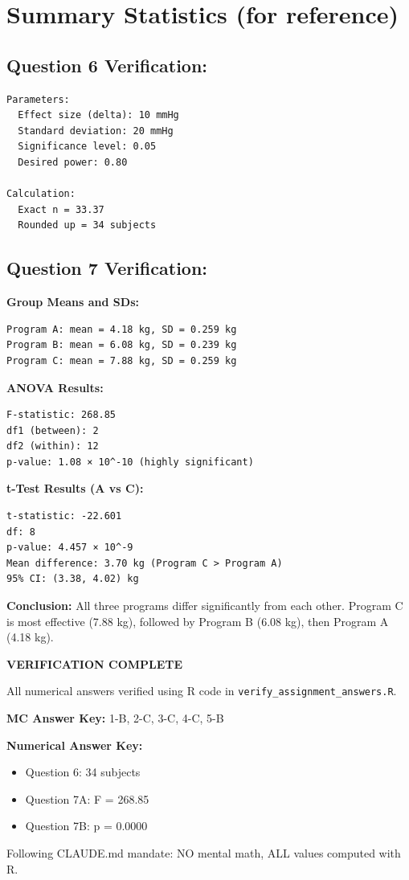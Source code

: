 \documentclass[11pt]{article}
\begin{document}
\newpage

\section*{Summary Statistics (for reference)}

\subsection*{Question 6 Verification:}
\begin{verbatim}
Parameters:
  Effect size (delta): 10 mmHg
  Standard deviation: 20 mmHg
  Significance level: 0.05
  Desired power: 0.80

Calculation:
  Exact n = 33.37
  Rounded up = 34 subjects
\end{verbatim}

\subsection*{Question 7 Verification:}
\textbf{Group Means and SDs:}
\begin{verbatim}
Program A: mean = 4.18 kg, SD = 0.259 kg
Program B: mean = 6.08 kg, SD = 0.239 kg
Program C: mean = 7.88 kg, SD = 0.259 kg
\end{verbatim}

\textbf{ANOVA Results:}
\begin{verbatim}
F-statistic: 268.85
df1 (between): 2
df2 (within): 12
p-value: 1.08 × 10^-10 (highly significant)
\end{verbatim}

\textbf{t-Test Results (A vs C):}
\begin{verbatim}
t-statistic: -22.601
df: 8
p-value: 4.457 × 10^-9
Mean difference: 3.70 kg (Program C > Program A)
95% CI: (3.38, 4.02) kg
\end{verbatim}

\textbf{Conclusion:} All three programs differ significantly from each other. Program C is most effective (7.88 kg), followed by Program B (6.08 kg), then Program A (4.18 kg).

\vspace{1cm}

\begin{tcolorbox}[colback=green!5,colframe=green!50!black,boxrule=1pt,arc=0pt]
\textbf{VERIFICATION COMPLETE}

All numerical answers verified using R code in \texttt{verify\_assignment\_answers.R}.

\textbf{MC Answer Key:} 1-B, 2-C, 3-C, 4-C, 5-B

\textbf{Numerical Answer Key:}
\begin{itemize}
\item Question 6: 34 subjects
\item Question 7A: F = 268.85
\item Question 7B: p = 0.0000
\end{itemize}

Following CLAUDE.md mandate: NO mental math, ALL values computed with R.
\end{tcolorbox}
\end{document}
